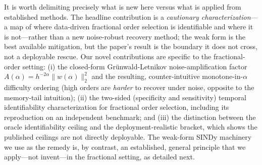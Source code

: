 \documentclass[review,3p,times]{elsarticle}
\begin{document}
It is worth delimiting precisely what is new here versus what is applied from established methods. The headline contribution is a \emph{cautionary characterization}---a map of where data-driven fractional order selection is identifiable and where it is not---rather than a new noise-robust recovery method; the weak form is the best available mitigation, but the paper's result is the boundary it does not cross, not a deployable rescue. Our novel contributions are specific to the fractional-order setting: (i) the closed-form Gr\"unwald-Letnikov noise-amplification factor $A(\alpha) = h^{-2\alpha}\|w(\alpha)\|_2^2$ and the resulting, counter-intuitive monotone-in-$\alpha$ difficulty ordering (high orders are \emph{harder} to recover under noise, opposite to the memory-tail intuition); (ii) the two-sided (specificity and sensitivity) temporal identifiability characterization for fractional order selection, including its reproduction on an independent benchmark; and (iii) the distinction between the oracle identifiability ceiling and the deployment-realistic bracket, which shows the published ceilings are not directly deployable. The weak-form SINDy machinery we use as the remedy is, by contrast, an established, general principle that we apply---not invent---in the fractional setting, as detailed next.
\end{document}
